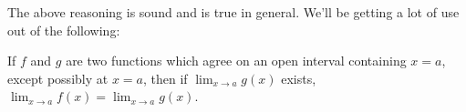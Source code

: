 \documentclass{ximera}
\begin{document}
The above reasoning is sound and is true in general.  We'll be getting a lot of use out of the following:


\begin{theorem}  \label{limitsagree} If $f$ and $g$ are two functions which agree on an open interval containing $x = a$, except possibly at $x = a$, then if $\lim_{x \rightarrow a} g(x)$ exists, $\lim_{x \rightarrow a} f(x) = \lim_{x \rightarrow a} g(x)$.


\end{theorem}




\closegraphsfile
\end{document}

